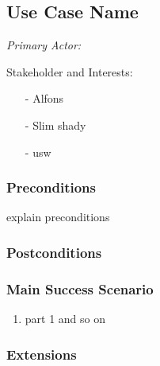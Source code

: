 \documentclass[./detailed_overview_usecases.tex]{subfiles}
\begin{document}
    \subsection{Use Case Name}


    \textit{Primary Actor:}
    \newline

    Stakeholder and Interests:
    \begin{itemize}
        \item[-] Alfons
        \item[-] Slim shady
        \item[-] usw
    \end{itemize}

    \subsubsection*{Preconditions}
    explain preconditions

    \subsubsection*{Postconditions}

    \subsubsection*{Main Success Scenario}
    \begin{enumerate}
        \item part 1 and so on
    \end{enumerate}

    \subsubsection*{Extensions}
\end{document}
